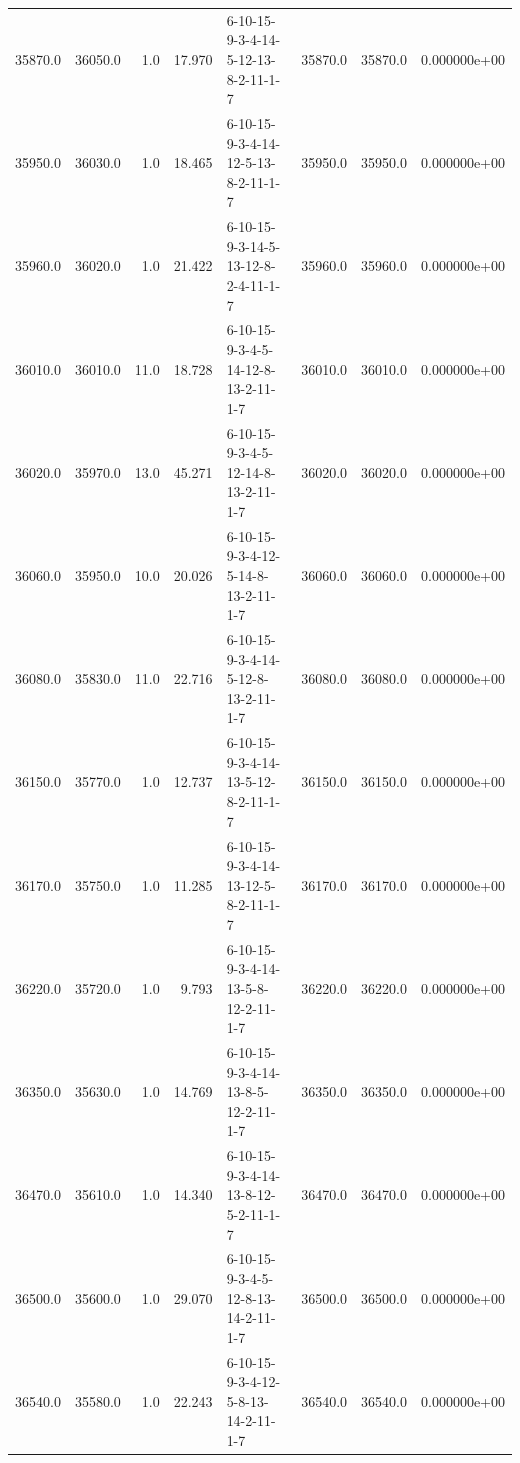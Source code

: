 \begin{tabular}{rrrrlrrr}
 35870.0 &  36050.0 &            1.0 &             17.970 &  6-10-15-9-3-4-14-5-12-13-8-2-11-1-7 &       35870.0 &         35870.0 &  0.000000e+00 \\
 35950.0 &  36030.0 &            1.0 &             18.465 &  6-10-15-9-3-4-14-12-5-13-8-2-11-1-7 &       35950.0 &         35950.0 &  0.000000e+00 \\
 35960.0 &  36020.0 &            1.0 &             21.422 &  6-10-15-9-3-14-5-13-12-8-2-4-11-1-7 &       35960.0 &         35960.0 &  0.000000e+00 \\
 36010.0 &  36010.0 &           11.0 &             18.728 &  6-10-15-9-3-4-5-14-12-8-13-2-11-1-7 &       36010.0 &         36010.0 &  0.000000e+00 \\
 36020.0 &  35970.0 &           13.0 &             45.271 &  6-10-15-9-3-4-5-12-14-8-13-2-11-1-7 &       36020.0 &         36020.0 &  0.000000e+00 \\
 36060.0 &  35950.0 &           10.0 &             20.026 &  6-10-15-9-3-4-12-5-14-8-13-2-11-1-7 &       36060.0 &         36060.0 &  0.000000e+00 \\
 36080.0 &  35830.0 &           11.0 &             22.716 &  6-10-15-9-3-4-14-5-12-8-13-2-11-1-7 &       36080.0 &         36080.0 &  0.000000e+00 \\
 36150.0 &  35770.0 &            1.0 &             12.737 &  6-10-15-9-3-4-14-13-5-12-8-2-11-1-7 &       36150.0 &         36150.0 &  0.000000e+00 \\
 36170.0 &  35750.0 &            1.0 &             11.285 &  6-10-15-9-3-4-14-13-12-5-8-2-11-1-7 &       36170.0 &         36170.0 &  0.000000e+00 \\
 36220.0 &  35720.0 &            1.0 &              9.793 &  6-10-15-9-3-4-14-13-5-8-12-2-11-1-7 &       36220.0 &         36220.0 &  0.000000e+00 \\
 36350.0 &  35630.0 &            1.0 &             14.769 &  6-10-15-9-3-4-14-13-8-5-12-2-11-1-7 &       36350.0 &         36350.0 &  0.000000e+00 \\
 36470.0 &  35610.0 &            1.0 &             14.340 &  6-10-15-9-3-4-14-13-8-12-5-2-11-1-7 &       36470.0 &         36470.0 &  0.000000e+00 \\
 36500.0 &  35600.0 &            1.0 &             29.070 &  6-10-15-9-3-4-5-12-8-13-14-2-11-1-7 &       36500.0 &         36500.0 &  0.000000e+00 \\
 36540.0 &  35580.0 &            1.0 &             22.243 &  6-10-15-9-3-4-12-5-8-13-14-2-11-1-7 &       36540.0 &         36540.0 &  0.000000e+00 \\

\end{tabular}
